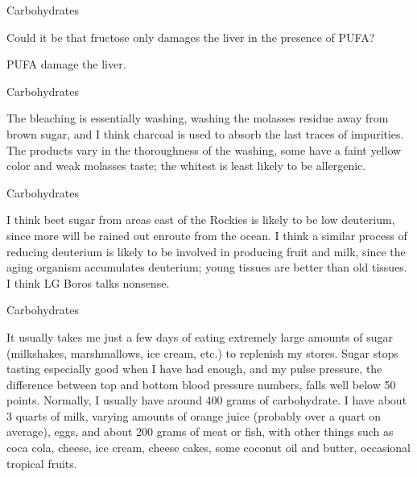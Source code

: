\documentclass[11pt,oneside,openany,extrafontsizes]{memoir}
\begin{document}
\begin{emailexchange}{Carbohydrates}
    \begin{question}
        Could it be that fructose only damages the liver in the presence of PUFA?
    \end{question}

    \begin{answer}
      PUFA damage the liver.
    \end{answer}
\end{emailexchange}

\begin{standalonequote}{Carbohydrates}

    \begin{answer}
      The bleaching is essentially washing, washing the molasses residue away from brown sugar, and I think charcoal is used to absorb the last traces of impurities. The products vary in the thoroughness of the washing, some have a faint yellow color and weak molasses taste; the whitest is least likely to be allergenic.
    \end{answer}
\end{standalonequote}

\begin{standalonequote}{Carbohydrates}

    \begin{answer}
      I think beet sugar from areas east of the Rockies is likely to be low deuterium, since more will be rained out enroute from the ocean. I think a similar process of reducing deuterium is likely to be involved in producing fruit and milk, since the aging organism accumulates deuterium; young tissues are better than old tissues. I think LG Boros talks nonsense.
    \end{answer}
\end{standalonequote}

\begin{standalonequote}{Carbohydrates}

    \begin{answer}
      It usually takes me just a few days of eating extremely large amounts of sugar (milkshakes, marshmallows, ice cream, etc.) to replenish my stores. Sugar stops tasting especially good when I have had enough, and my pulse pressure, the difference between top and bottom blood pressure numbers, falls well below 50 points. Normally, I usually have around 400 grams of carbohydrate. I have about 3 quarts of milk, varying amounts of orange juice (probably over a quart on average), eggs, and about 200 grams of meat or fish, with other things such as coca cola, cheese, ice cream, cheese cakes, some coconut oil and butter, occasional tropical fruits.
    \end{answer}
\end{standalonequote}
\end{document}
